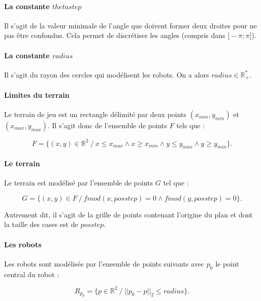 \documentclass{article}
\begin{document}
\paragraph{La constante $thetastep$} Il s'agit de la valeur minimale de l'angle que doivent former deux droites pour ne pas être confondus. Cela permet de discrétiser les angles (compris dans $]-\pi ; \pi]$).

\paragraph{La constante $radius$} Il s'agit du rayon des cercles qui modélisent les robots. On a alors $radius \in \mathbb{R}^*_+$.

\paragraph{Limites du terrain} Le terrain de jeu est un rectangle délimité par deux points $(x_{min}, y_{min})$ et $(x_{max}, y_{max})$. Il s'agit donc de l'ensemble de points $F$ tels que :

\begin{equation*}
F = \{ (x, y) \in \mathbb{R}^2 \ /\  x \leqslant x_{max} \wedge x \geqslant x_{min} \wedge y \leqslant y_{max} \wedge y \geqslant y_{min} \}.
\end{equation*}

\paragraph{Le terrain} Le terrain est modélisé par l'ensemble de points $G$ tel que :

\begin{equation*}
G = \{ (x, y) \in F \ /\  fmod(x, posstep) = 0 \wedge fmod(y, posstep) = 0 \}.
\end{equation*}

Autrement dit, il s'agit de la grille de points contenant l'origine du plan et dont la taille des cases est de $posstep$.

\paragraph{Les robots} Les robots sont modélisés par l'ensemble de points suivants avec $p_0$ le point central du robot :

\begin{equation*}
    R_{p_0} = \{ p \in \mathbb{R}^2 \ /\  ||p_0 - p||_2 \leqslant radius \}.
\end{equation*}
\end{document}
